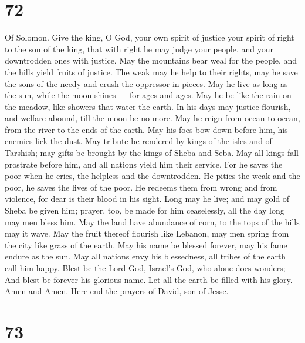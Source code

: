 \hypertarget{section-71}{%
\section{72}\label{section-71}}

Of Solomon.  Give the king, O God, your own spirit of
justice your spirit of right to the son of the king,  that
with right he may judge your people, and your downtrodden ones with
justice.  May the mountains bear weal for the people, and
the hills yield fruits of justice.  The weak may he help to
their rights, may he save the sons of the needy and crush the oppressor
in pieces.  May he live as long as the sun, while the moon
shines --- for ages and ages.  May he be like the rain on
the meadow, like showers that water the earth.  In his days
may justice flourish, and welfare abound, till the moon be no more.
 May he reign from ocean to ocean, from the river to the
ends of the earth.  May his foes bow down before him, his
enemies lick the dust.  May tribute be rendered by kings of
the isles and of Tarshish; may gifts be brought by the kings of Sheba
and Seba.  May all kings fall prostrate before him, and all
nations yield him their service.  For he saves the poor
when he cries, the helpless and the downtrodden.  He pities
the weak and the poor, he saves the lives of the poor.  He
redeems them from wrong and from violence, for dear is their blood in
his sight.  Long may he live; and may gold of Sheba be
given him; prayer, too, be made for him ceaselessly, all the day long
may men bless him.  May the land have abundance of corn, to
the tops of the hills may it wave. May the fruit thereof flourish like
Lebanon, may men spring from the city like grass of the earth.
 May his name be blessed forever, may his fame endure as
the sun. May all nations envy his blessedness, all tribes of the earth
call him happy.  Blest be the Lord God, Israel's God, who
alone does wonders;  And blest be forever his glorious
name. Let all the earth be filled with his glory. Amen and Amen.
 Here end the prayers of David, son of Jesse.

\hypertarget{section-72}{%
\section{73}\label{section-72}}

